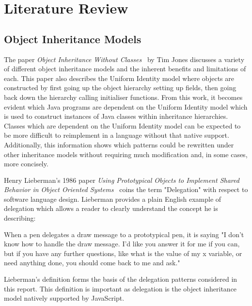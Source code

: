 \chapter{Literature Review}\label{C:us}
\section{Object Inheritance Models}
The paper \textit{Object Inheritance Without Classes~\cite{InheritanceWithoutClasses}} by Tim Jones discusses a variety of different object inheritance models and the inherent benefits and limitations of each. This paper also describes the Uniform Identity model where objects are constructed by first going up the object hierarchy setting up fields, then going back down the hierarchy calling initialiser functions. From this work, it becomes evident which Java programs are dependent on the Uniform Identity model which is used to construct instances of Java classes within inheritance hierarchies. Classes which are dependent on the Uniform Identity model can be expected to be more difficult to reimplement in a language without that native support. Additionally, this information shows which patterns could be rewritten under other inheritance models without requiring much modification and, in some cases, more concisely.
\newline

Henry Lieberman's 1986 paper \textit{Using Prototypical Objects to Implement Shared Behavior in Object Oriented Systems~\cite{UsingPrototypicalObjects}} coins the term "Delegation" with respect to software language design. Lieberman provides a plain English example of delegation which allows a reader to clearly understand the concept he is describing:
\begin{displayquote}
	When a pen delegates a draw message to a prototypical pen, it is saying "I don't know how to handle the draw message. I'd like you answer it for me if you can, but if you have any further questions, like what is the value of my x variable, or need anything done, you should come back to me and ask."~\cite{UsingPrototypicalObjects}
\end{displayquote}
Lieberman's definition forms the basis of the delegation patterns considered in this report. This definition is important as delegation is the object inheritance model natively supported by JavaScript.
\newline

